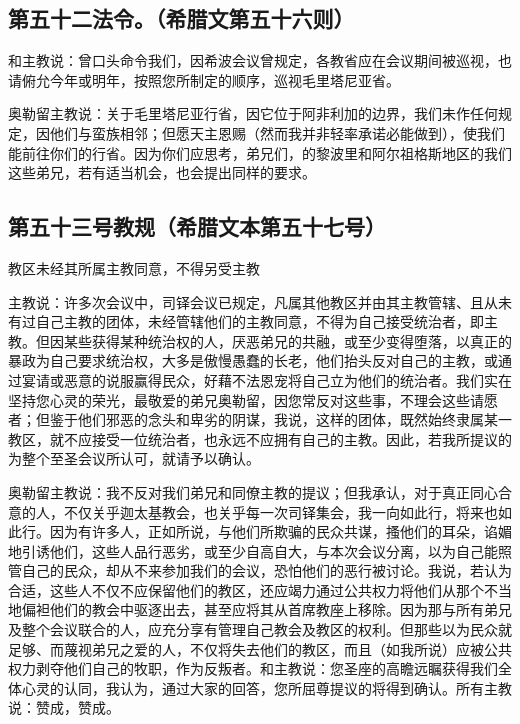 
\subsection{第五十二法令。（希腊文第五十六则）}

\par

和主教说：曾口头命令我们，因希波会议曾规定，各教省应在会议期间被巡视，也请俯允今年或明年，按照您所制定的顺序，巡视毛里塔尼亚省。\par

奥勒留主教说：关于毛里塔尼亚行省，因它位于阿非利加的边界，我们未作任何规定，因他们与蛮族相邻；但愿天主恩赐（然而我并非轻率承诺必能做到），使我们能前往你们的行省。因为你们应思考，弟兄们，的黎波里和阿尔祖格斯地区的我们这些弟兄，若有适当机会，也会提出同样的要求。\par


\subsection{第五十三号教规（希腊文本第五十七号）}

教区未经其所属主教同意，不得另受主教\par

主教说：许多次会议中，司铎会议已规定，凡属其他教区并由其主教管辖、且从未有过自己主教的团体，未经管辖他们的主教同意，不得为自己接受统治者，即主教。但因某些获得某种统治权的人，厌恶弟兄的共融，或至少变得堕落，以真正的暴政为自己要求统治权，大多是傲慢愚蠢的长老，他们抬头反对自己的主教，或通过宴请或恶意的说服赢得民众，好藉不法恩宠将自己立为他们的统治者。我们实在坚持您心灵的荣光，最敬爱的弟兄奥勒留，因您常反对这些事，不理会这些请愿者；但鉴于他们邪恶的念头和卑劣的阴谋，我说，这样的团体，既然始终隶属某一教区，就不应接受一位统治者，也永远不应拥有自己的主教。因此，若我所提议的为整个至圣会议所认可，就请予以确认。\par

奥勒留主教说：我不反对我们弟兄和同僚主教的提议；但我承认，对于真正同心合意的人，不仅关乎迦太基教会，也关乎每一次司铎集会，我一向如此行，将来也如此行。因为有许多人，正如所说，与他们所欺骗的民众共谋，搔他们的耳朵，谄媚地引诱他们，这些人品行恶劣，或至少自高自大，与本次会议分离，以为自己能照管自己的民众，却从不来参加我们的会议，恐怕他们的恶行被讨论。我说，若认为合适，这些人不仅不应保留他们的教区，还应竭力通过公共权力将他们从那个不当地偏袒他们的教会中驱逐出去，甚至应将其从首席教座上移除。因为那与所有弟兄及整个会议联合的人，应充分享有管理自己教会及教区的权利。但那些以为民众就足够、而蔑视弟兄之爱的人，不仅将失去他们的教区，而且（如我所说）应被公共权力剥夺他们自己的牧职，作为反叛者。和主教说：您圣座的高瞻远瞩获得我们全体心灵的认同，我认为，通过大家的回答，您所屈尊提议的将得到确认。所有主教说：赞成，赞成。\par

